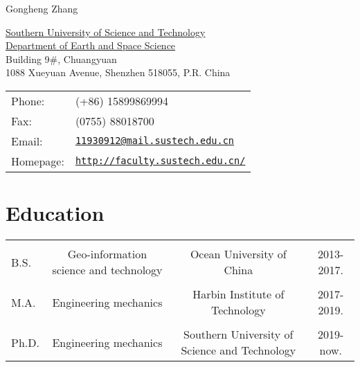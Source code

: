 \documentclass[letterpaper]{article}
\def\name{Gongheng Zhang}
\renewenvironment{itemize}{
  \begin{list}{}{
    \setlength{\leftmargin}{1.2em}
  }
}{
  \end{list}
}
\begin{document}
\hspace{-0.3in}
{\huge \name}


\vspace{0.25in}

\begin{minipage}{0.55\linewidth}
  \href{https://www.sustech.edu.cn/}{Southern University of Science and Technology} \\ 
  \href{http://ess.sustc.edu.cn/}{Department of Earth and Space Science} \\
  Building 9\#, Chuangyuan\\
  1088 Xueyuan Avenue, Shenzhen 518055, P.R. China
\end{minipage}
\begin{minipage}{0.4\linewidth}
  \begin{tabular}{ll}
    Phone: & (+86) 15899869994 \\
    Fax: &  (0755) 88018700 \\
    Email: & \href{mailto:11930912@mail.sustech.edu.cn}{\tt 11930912@mail.sustech.edu.cn} \\
    Homepage: & \href{http://faculty.sustech.edu.cn/}{\tt http://faculty.sustech.edu.cn/} \\
  \end{tabular}
\end{minipage}


%


\section*{Education}
\vspace{-0.1in}
\begin{table}[htbp]
	\raggedright  %
	\begin{tabular}{ l c c c }
		& & & \\[-6pt]  %
		\quad B.S. & Geo-information science and technology & Ocean University of China & 2013-2017. \\  
		& & & \\[-6pt]  %
		\quad M.A.& Engineering mechanics & Harbin Institute of Technology & 2017-2019. \\
		& & & \\[-6pt]  %
		\quad Ph.D.& Engineering mechanics & Southern University of Science and Technology & 2019-now.		
	\end{tabular}
\end{table}
\end{document}
